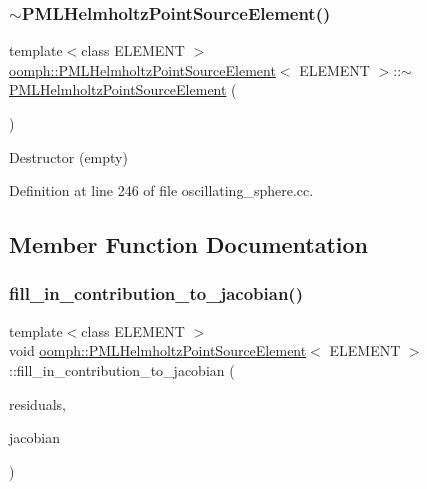 \subsubsection{\texorpdfstring{$\sim$\+P\+M\+L\+Helmholtz\+Point\+Source\+Element()}{~PMLHelmholtzPointSourceElement()}}
{\footnotesize\ttfamily template$<$class E\+L\+E\+M\+E\+NT $>$ \\
\hyperlink{classoomph_1_1PMLHelmholtzPointSourceElement}{oomph\+::\+P\+M\+L\+Helmholtz\+Point\+Source\+Element}$<$ E\+L\+E\+M\+E\+NT $>$\+::$\sim$\hyperlink{classoomph_1_1PMLHelmholtzPointSourceElement}{P\+M\+L\+Helmholtz\+Point\+Source\+Element} (\begin{DoxyParamCaption}{ }\end{DoxyParamCaption})\hspace{0.3cm}{\ttfamily [inline]}}



Destructor (empty) 



Definition at line 246 of file oscillating\+\_\+sphere.\+cc.



\subsection{Member Function Documentation}
\mbox{\label{classoomph_1_1PMLHelmholtzPointSourceElement_a046f79e3e1dcb266027366324e1e956d}} 
\subsubsection{\texorpdfstring{fill\+\_\+in\+\_\+contribution\+\_\+to\+\_\+jacobian()}{fill\_in\_contribution\_to\_jacobian()}}
{\footnotesize\ttfamily template$<$class E\+L\+E\+M\+E\+NT $>$ \\
void \hyperlink{classoomph_1_1PMLHelmholtzPointSourceElement}{oomph\+::\+P\+M\+L\+Helmholtz\+Point\+Source\+Element}$<$ E\+L\+E\+M\+E\+NT $>$\+::fill\+\_\+in\+\_\+contribution\+\_\+to\+\_\+jacobian (\begin{DoxyParamCaption}\item[{Vector$<$ double $>$ \&}]{residuals,  }\item[{Dense\+Matrix$<$ double $>$ \&}]{jacobian }\end{DoxyParamCaption})\hspace{0.3cm}{\ttfamily [inline]}}



